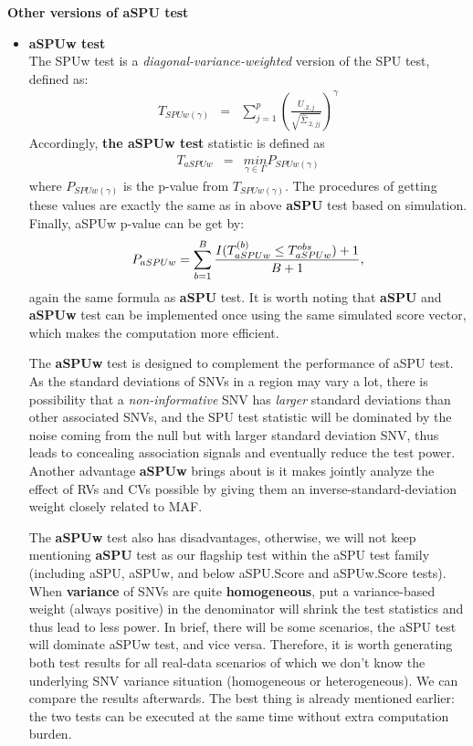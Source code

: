 \documentclass[12pt]{article}
\begin{document}
\textbf{Other versions of aSPU test}
\begin{itemize}
\item \textbf{aSPUw test}\\
The SPUw test is a \textit{diagonal-variance-weighted} version of the SPU test, defined as:
\begin{eqnarray*}
T_{SPUw(\gamma)} & = & \sum_{j=1}^{p}\left(\frac{U_{.2,j}}{\sqrt{\hat{\Sigma}_{.2,jj}}}\right)^{\gamma}
\end{eqnarray*}
Accordingly, \textbf{the aSPUw test} statistic is defined as
\begin{eqnarray*}
T_{aSPUw} & = & \underset{\gamma\in\Gamma}{min}P_{SPUw(\gamma)}
\end{eqnarray*}
where $P_{SPUw(\gamma)}$ is the p-value from $T_{SPUw(\gamma)}$. The procedures of getting these values are exactly the same as in above \textbf{aSPU} test based on simulation. Finally, aSPUw p-value can be get by:
$$
P_{aSPUw} = \sum_{b=1}^B { I(T ^ {(b)} _{aSPUw} \leq T ^ {obs} _{aSPUw} ) + 1  \over B + 1 },
$$
again the same formula as \textbf{aSPU} test. It is worth noting that \textbf{aSPU} and \textbf{aSPUw} test can be implemented once using the same simulated score vector, which makes the computation more efficient.

The \textbf{aSPUw} test is designed to complement the performance of aSPU test. As the standard deviations of SNVs in a region may vary a lot, there is possibility that a \textit{non-informative} SNV has \textit{larger} standard deviations than other associated SNVs, and the SPU test statistic will be dominated by the noise coming from the null but with larger standard deviation SNV, thus leads to concealing association signals and eventually reduce the test power. Another advantage \textbf{aSPUw} brings about is it makes jointly analyze the effect of RVs and CVs possible by giving them an inverse-standard-deviation weight closely related to MAF. 

The \textbf{aSPUw} test also has disadvantages, otherwise, we will not keep mentioning \textbf{aSPU} test as our flagship test within the aSPU test family (including aSPU, aSPUw, and below aSPU.Score and aSPUw.Score tests). When \textbf{variance} of SNVs are quite \textbf{homogeneous}, put a variance-based weight (always positive) in the denominator will shrink the test statistics and thus lead to less power. In brief, there will be some scenarios, the aSPU test will dominate aSPUw test, and vice versa. Therefore, it is worth generating both test results for all real-data scenarios of which we don't know the underlying SNV variance situation (homogeneous or heterogeneous). We can compare the results afterwards. The best thing is already mentioned earlier: the two tests can be executed at the same time without extra computation burden.


\end{itemize}
\end{document}
